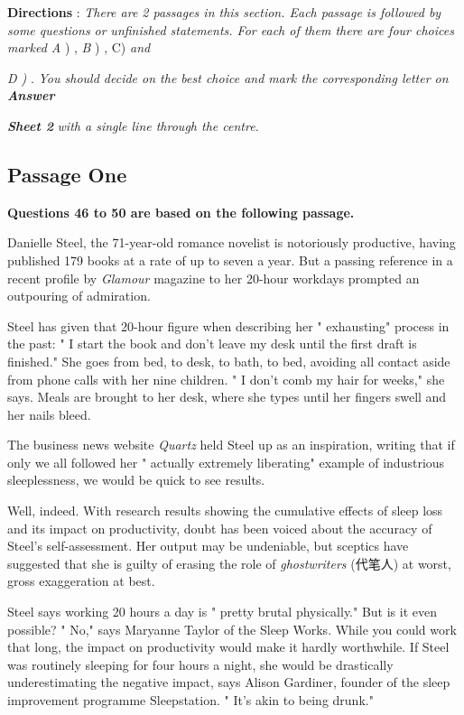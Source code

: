 \documentclass[UTF8,11pt]{ctexart}
\begin{document}
\textbf{Directions }: \textit{There are 2 passages in this section. Each passage is followed by some questions or} \textit{unfinished statements. For each of them there are four choices marked A }) , \textit{B }) , C) \textit{and}


\textit{D ) }. \textit{You should decide on the best choice and mark the corresponding letter on }\textbf{\textit{Answer}}


\textbf{\textit{Sheet 2 }}\textit{with a single line through the centre.}


\subsection*{\textbf{Passage One}}


\textbf{Questions 46 to 50 are based on the following passage.}


Danielle Steel, the 71-year-old romance novelist is notoriously productive, having published 179 books at a rate of up to seven a year. But a passing reference in a recent profile by \textit{Glamour }magazine to her 20-hour workdays prompted an outpouring of admiration.


Steel has given that 20-hour figure when describing her " exhausting" process in the past: " I start the book and don't leave my desk until the first draft is finished." She goes from bed, to desk, to bath, to bed, avoiding all contact aside from phone calls with her nine children. " I don't comb my hair for weeks," she says. Meals are brought to her desk, where she types until her fingers swell and her nails bleed.


The business news website \textit{Quartz }held Steel up as an inspiration, writing that if only we all followed her " actually extremely liberating" example of industrious sleeplessness, we would be quick to see results.


Well, indeed. With research results showing the cumulative effects of sleep loss and its impact on productivity, doubt has been voiced about the accuracy of Steel's self-assessment. Her output may be undeniable, but sceptics have suggested that she is guilty of erasing the role of \textit{ghostwriters }(代笔人) at worst, gross exaggeration at best.


Steel says working 20 hours a day is " pretty brutal physically." But is it even possible? " No," says Maryanne Taylor of the Sleep Works. While you could work that long, the impact on productivity would make it hardly worthwhile. If Steel was routinely sleeping for four hours a night, she would be drastically underestimating the negative impact, says Alison Gardiner, founder of the sleep improvement programme Sleepstation. " It's akin to being drunk."
\end{document}
